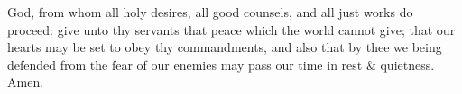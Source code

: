 \documentclass[MAIN]{subfiles}
\begin{document}
God, from whom all holy desires, all good counsels, and all just works do proceed: give unto thy servants that peace which the world cannot give; that our hearts may be set to obey thy commandments, and also that by thee we being defended from the fear of our enemies may pass our time in rest \& quietness. Amen.
\end{document}
